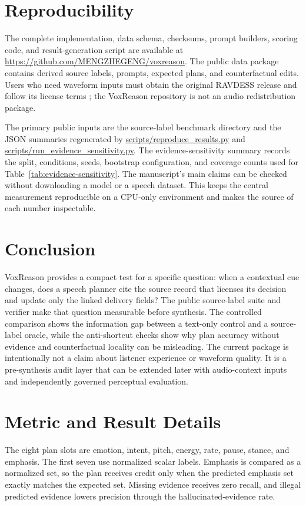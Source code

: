 \documentclass{article}
\newcommand{\repo}{\url{https://github.com/MENGZHEGENG/voxreason}}
\begin{document}
\section{Reproducibility}

The complete implementation, data schema, checksums, prompt builders, scoring code, and result-generation script are available at \repo. The public data package contains derived source labels, prompts, expected plans, and counterfactual edits. Users who need waveform inputs must obtain the original RAVDESS release and follow its license terms \cite{ravdess}; the VoxReason repository is not an audio redistribution package.

The primary public inputs are the source-label benchmark directory and the JSON summaries regenerated by \url{scripts/reproduce_results.py} and \url{scripts/run_evidence_sensitivity.py}. The evidence-sensitivity summary records the split, conditions, seeds, bootstrap configuration, and coverage counts used for Table~\ref{tab:evidence-sensitivity}. The manuscript's main claims can be checked without downloading a model or a speech dataset. This keeps the central measurement reproducible on a CPU-only environment and makes the source of each number inspectable.

\section{Conclusion}

VoxReason provides a compact test for a specific question: when a contextual cue changes, does a speech planner cite the source record that licenses its decision and update only the linked delivery fields? The public source-label suite and verifier make that question measurable before synthesis. The controlled comparison shows the information gap between a text-only control and a source-label oracle, while the anti-shortcut checks show why plan accuracy without evidence and counterfactual locality can be misleading. The current package is intentionally not a claim about listener experience or waveform quality. It is a pre-synthesis audit layer that can be extended later with audio-context inputs and independently governed perceptual evaluation.

\appendix
\section{Metric and Result Details}

The eight plan slots are emotion, intent, pitch, energy, rate, pause, stance, and emphasis. The first seven use normalized scalar labels. Emphasis is compared as a normalized set, so the plan receives credit only when the predicted emphasis set exactly matches the expected set. Missing evidence receives zero recall, and illegal predicted evidence lowers precision through the hallucinated-evidence rate.
\end{document}
